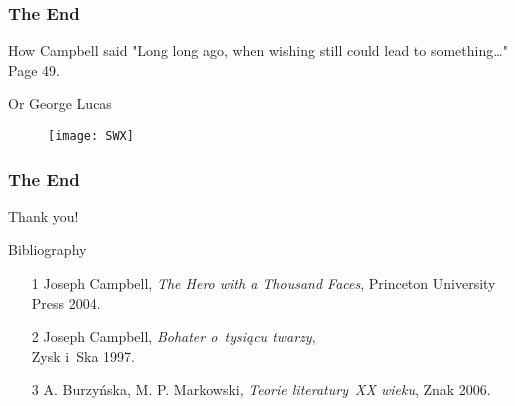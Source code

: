 \documentclass[10pt,t]{beamer}
\begin{document}
\begin{frame}
  \frametitle{The End}

\begin{block}{How Campbell said}
  "Long long ago, when wishing still could lead to something\ldots"
  Page 49.
\end{block}

\begin{block}{Or George Lucas}
  \begin{figure}
    \centering

    \texttt{[image: SWX]}
  \end{figure}
\end{block}

\end{frame}



\begin{frame}
  \frametitle{The End}
  \begin{center}
    \LARGE{Thank you!}
  \end{center}

\end{frame}



\begin{frame}

  \begin{block}{Bibliography}
    \begin{itemize}
    \item[1] Joseph Campbell, \emph{The Hero with a Thousand Faces},
      Princeton University Press 2004.
    \item[2] Joseph Campbell, \emph{Bohater o~tysiącu twarzy}, \\ Zysk
      i~Sk\dywiz a 1997.
    \item[3] A. Burzyńska, M. P. Markowski, \emph{Teorie literatury~XX
        wieku}, Znak 2006.
    \end{itemize}
  \end{block}

\end{frame}





 {}



\end{document}
